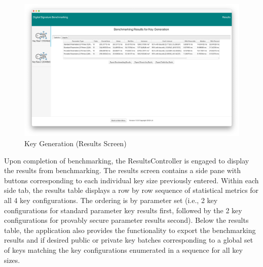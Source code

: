 \documentclass[]{final_report}
\theoremstyle{definition}
\begin{document}
\begin{figure}[H]
    \centering
    \includegraphics[scale= 0.325]{main_pictures/ui/keyGen/keyGen4.png}
    \caption{Key Generation (Results Screen)}
\end{figure}
Upon completion of benchmarking, the ResultsController is engaged to display the results from benchmarking. The results screen contains a side pane with buttons corresponding to each individual key size previously entered. Within each side tab, the results table displays a row by row sequence of statistical metrics for all 4 key configurations.  The ordering is by parameter set (i.e., 2 key configurations for standard parameter key results first, followed by the 2 key configurations for provably secure parameter results second). Below the results table, the application also provides the functionality to export the benchmarking results and if desired public or private key batches corresponding to a global set of keys matching the key configurations enumerated in a sequence for all key sizes.
\end{document}
